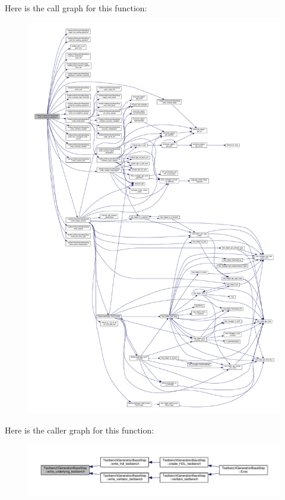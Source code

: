 Here is the call graph for this function\+:
\nopagebreak
\begin{figure}[H]
\begin{center}
\leavevmode
\includegraphics[width=350pt]{dc/d02/classTestbenchGenerationBaseStep_a6feec8a1c8dc902e8b9644a956f878a4_cgraph}
\end{center}
\end{figure}
Here is the caller graph for this function\+:
\nopagebreak
\begin{figure}[H]
\begin{center}
\leavevmode
\includegraphics[width=350pt]{dc/d02/classTestbenchGenerationBaseStep_a6feec8a1c8dc902e8b9644a956f878a4_icgraph}
\end{center}
\end{figure}
\mbox{\label{classTestbenchGenerationBaseStep_a58c9e59ffac01539a187a955b038413f}} 
